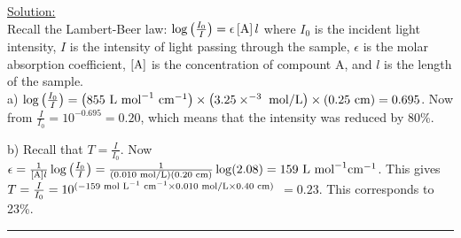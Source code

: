 \noindent
\underline{Solution:}\\

\noindent
Recall the Lambert-Beer law: $\log\left(\frac{I_0}{I}\right) = \epsilon\left[\textnormal{A}\right]l$ where $I_0$ is the incident light intensity, $I$ is the intensity of light passing through the sample, $\epsilon$ is the molar absorption coefficient, $\left[\textnormal{A}\right]$ is the concentration of compount A, and $l$ is the length of the sample.\\

\noindent
a) $\log\left(\frac{I_0}{I}\right) = \left(855\textnormal{ L mol}^{-1}\textnormal{ cm}^{-1}\right)\times\left(3.25\times^{-3}\textnormal{ mol/L}\right)\times\left(0.25\textnormal{ cm}\right) = 0.695$. Now from $\frac{I}{I_0} = 10^{-0.695} = 0.20$, which means that the intensity was reduced by 80\%.

\noindent
b) Recall that $T = \frac{I}{I_0}$. Now $\epsilon = \frac{1}{\left[\textnormal{A}\right]l}\log\left(\frac{I_0}{I}\right) = \frac{1}{\left(0.010\textnormal{ mol/L}\right)\left(0.20\textnormal{ cm}\right)}\log(2.08) = 159\textnormal{ L mol}^{-1}\textnormal{cm}^{-1}$. This gives $T = \frac{I}{I_0} = 10^{(-159\textnormal{ mol L}^{-1}\textnormal{ cm}^{-1}\times 0.010\textnormal{ mol/L}\times 0.40\textnormal{ cm})}$ $= 0.23$. This corresponds to 23\%.

\hrule\vspace{0.5cm}



